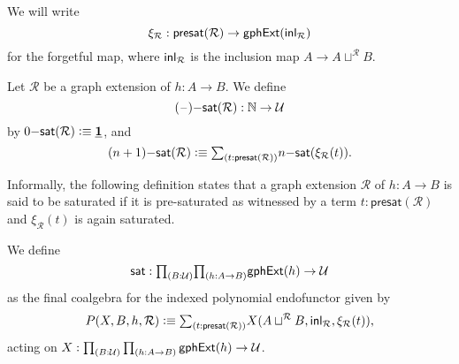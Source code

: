 We will write 
\begin{equation*}
\xi_{\mathcal{R}}: \mathsf{presat}(\mathcal{R})\to \mathsf{gphExt}({\mathsf{inl}}_\mathcal{R})
\end{equation*}
for the forgetful map, where ${\mathsf{inl}}_\mathcal{R}$ is the inclusion map $A\to A\sqcup^{\mathcal{R}} B$. 

\begin{defn}
Let $\mathcal{R}$ be a graph extension of $h:A\to B$. 
We define
\begin{equation*}
(\mathord{\hspace{1pt}\text{--}\hspace{1pt}})\mathsf{{-}sat}(\mathcal{R}) : \mathbb{N}\to\mathcal{U}
\end{equation*}
by $0\mathsf{{-}sat}(\mathcal{R})\vcentcolon\equiv \underline{\mathbf{1}}$, and 
\begin{equation*}
(n+1)\mathsf{{-}sat}(\mathcal{R})\defeq \sm{t:\mathsf{presat}(\mathcal{R})} n\mathsf{{-}sat}(\xi_{\mathcal{R}}(t)).
\end{equation*}
\end{defn}

Informally, the following definition states that a graph extension $\mathcal{R}$ of $h:A\to B$ is said to be saturated if it is pre-saturated as witnessed by a term $t:\mathsf{presat}(\mathcal{R})$ and $\xi_{\mathcal{R}}(t)$ is again saturated.

\begin{defn}\label{defn:saturated}
We define
\begin{equation*}
\mathsf{sat} : \prd{B:\UU}{h:A \to B} \mathsf{gphExt}(h)\to\UU
\end{equation*}
as the final coalgebra for the indexed polynomial endofunctor given by
\begin{equation*}
P(X,B,h,\mathcal{R}) \defeq \sm{t:\mathsf{presat}(\mathcal{R})} X(A\sqcup^{\mathcal{R}} B,\inl_{\mathcal{R}},\xi_{\mathcal{R}}(t)),
\end{equation*}
acting on $X:\prd{B:\UU}{h:A \to B} \mathsf{gphExt}(h)\to\UU$.
\end{defn}

